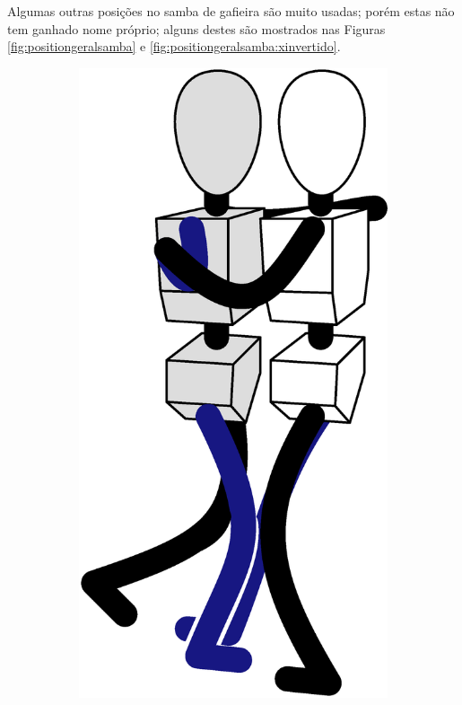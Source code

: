 Algumas outras posições no samba de gafieira são muito usadas;
porém estas não tem ganhado nome próprio;
alguns destes  são mostrados nas
Figuras \ref{fig:positiongeralsamba} e \ref{fig:positiongeralsamba:xinvertido}.
\begin{figure}[!ht]
     \centering
     \begin{subfigure}[b]{0.2175\textwidth}
         \centering
         \includegraphics[width=\textwidth]{chapters/cap-normas/position-ffa.eps}

\end{subfigure}
\end{figure}
